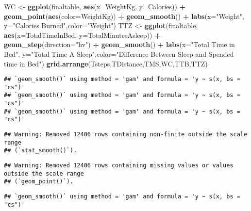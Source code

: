 \documentclass[
]{article}
\newenvironment{Shaded}{\begin{snugshade}}{\end{snugshade}}
\newcommand{\AttributeTok}[1]{\textcolor[rgb]{0.13,0.29,0.53}{#1}}
\newcommand{\FunctionTok}[1]{\textcolor[rgb]{0.13,0.29,0.53}{\textbf{#1}}}
\newcommand{\NormalTok}[1]{#1}
\newcommand{\OtherTok}[1]{\textcolor[rgb]{0.56,0.35,0.01}{#1}}
\newcommand{\SpecialCharTok}[1]{\textcolor[rgb]{0.81,0.36,0.00}{\textbf{#1}}}
\newcommand{\StringTok}[1]{\textcolor[rgb]{0.31,0.60,0.02}{#1}}
\begin{document}
\begin{Shaded}
\begin{Highlighting}[]
\NormalTok{WC }\OtherTok{\textless{}{-}} \FunctionTok{ggplot}\NormalTok{(finaltable, }\FunctionTok{aes}\NormalTok{(}\AttributeTok{x=}\NormalTok{WeightKg, }\AttributeTok{y=}\NormalTok{Calories)) }\SpecialCharTok{+} \FunctionTok{geom\_point}\NormalTok{(}\FunctionTok{aes}\NormalTok{(}\AttributeTok{color=}\NormalTok{WeightKg)) }\SpecialCharTok{+} \FunctionTok{geom\_smooth}\NormalTok{() }\SpecialCharTok{+} \FunctionTok{labs}\NormalTok{(}\AttributeTok{x=}\StringTok{"Weight"}\NormalTok{, }\AttributeTok{y=}\StringTok{"Calories Burned"}\NormalTok{,}\AttributeTok{color=}\StringTok{"Weight"}\NormalTok{)}
\NormalTok{TTZ }\OtherTok{\textless{}{-}} \FunctionTok{ggplot}\NormalTok{(finaltable, }\FunctionTok{aes}\NormalTok{(}\AttributeTok{x=}\NormalTok{TotalTimeInBed, }\AttributeTok{y=}\NormalTok{TotalMinutesAsleep)) }\SpecialCharTok{+} \FunctionTok{geom\_step}\NormalTok{(}\AttributeTok{direction=}\StringTok{"hv"}\NormalTok{) }\SpecialCharTok{+} \FunctionTok{geom\_smooth}\NormalTok{() }\SpecialCharTok{+} \FunctionTok{labs}\NormalTok{(}\AttributeTok{x=}\StringTok{"Total Time in Bed"}\NormalTok{, }\AttributeTok{y=}\StringTok{"Total Time A Sleep"}\NormalTok{,}\AttributeTok{color=}\StringTok{"Difference Between Sleep and Spended time in Bed"}\NormalTok{)}
\FunctionTok{grid.arrange}\NormalTok{(Tsteps,TDistance,TMS,WC,TTB,TTZ)}
\end{Highlighting}
\end{Shaded}

\begin{verbatim}
## `geom_smooth()` using method = 'gam' and formula = 'y ~ s(x, bs = "cs")'
## `geom_smooth()` using method = 'gam' and formula = 'y ~ s(x, bs = "cs")'
## `geom_smooth()` using method = 'gam' and formula = 'y ~ s(x, bs = "cs")'
\end{verbatim}

\begin{verbatim}
## Warning: Removed 12406 rows containing non-finite outside the scale range
## (`stat_smooth()`).
\end{verbatim}

\begin{verbatim}
## Warning: Removed 12406 rows containing missing values or values outside the scale range
## (`geom_point()`).
\end{verbatim}

\begin{verbatim}
## `geom_smooth()` using method = 'gam' and formula = 'y ~ s(x, bs = "cs")'
\end{verbatim}
\end{document}
